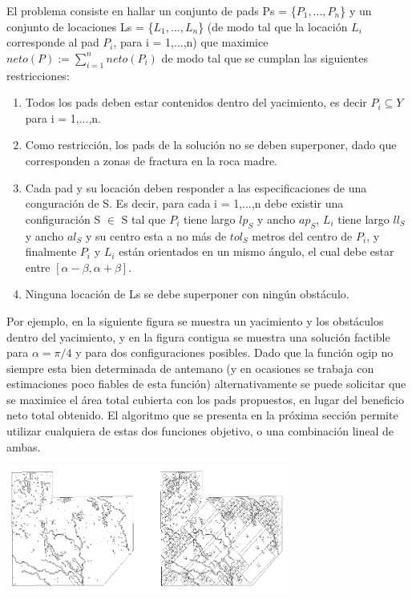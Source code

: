 El problema consiste en hallar un conjunto de pads Ps = \{$P_1, ... ,P_n$\} y un conjunto de locaciones Ls = \{$L_1, ..., L_n$\} (de modo tal que la locaci\'on $L_i$ corresponde al pad $P_i$, para i = 1,...,n) que maximice $neto(P) :=  \sum_{i=1}^{n} neto(P_i) $ de modo tal que se cumplan las siguientes restricciones:

\begin{enumerate}
\item Todos los pads deben estar contenidos dentro del yacimiento, es decir $P_i \subseteq Y$ para i = 1,...,n.
\item Como restricci\'on, los pads de la soluci\'on no se deben superponer, dado que corresponden a zonas de fractura en la roca madre.
\item Cada pad y su locaci\'on deben responder a las especificaciones de una conguraci\'on de S. Es decir, para cada i = 1,...,n debe existir una configuraci\'on S $\in$ S tal que $P_i$ tiene largo $lp_S$ y ancho $ap_S$, $L_i$ tiene largo $ll_S$ y ancho $al_S$ y su centro esta a no m\'as de $tol_S$ metros del centro de $P_i$, y finalmente $P_i$ y $L_i$ est\'an orientados en un mismo \'angulo, el cual debe estar entre $[\alpha - \beta, \alpha + \beta]$.
\item Ninguna locaci\'on de Ls se debe superponer con ning\'un obst\'aculo.
\end{enumerate}


Por ejemplo, en la siguiente figura se muestra un yacimiento y los obst\'aculos dentro del yacimiento, y en la figura contigua se muestra una soluci\'on factible para $\alpha = \pi / 4$ y para dos configuraciones posibles. Dado que la funci\'on ogip no siempre esta bien determinada de antemano (y en ocasiones se trabaja con estimaciones poco fiables de esta funci\'on) alternativamente se puede solicitar que se maximice el \'area total cubierta con los pads propuestos, en lugar del beneficio neto total obtenido. El algoritmo que se presenta en la pr\'oxima secci\'on permite utilizar cualquiera de estas dos funciones objetivo, o una combinaci\'on lineal de ambas.



\begin{center}
\includegraphics[width=0.7\textwidth]{imagenes/figura7}
\end{center}



